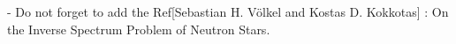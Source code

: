 \smallskip
\qquad - Do not forget to add the Ref[Sebastian H. Völkel and Kostas D. Kokkotas] :  On the Inverse Spectrum Problem of Neutron Stars.






\vfill \eject \bye





